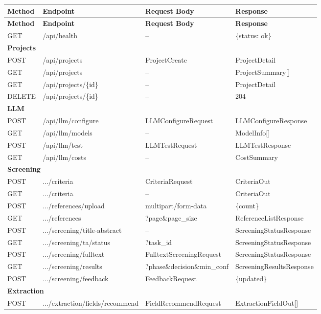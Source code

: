 \documentclass[11pt,a4paper]{article}
\begin{document}
\begin{longtable}{llp{4cm}p{3cm}}
\toprule
\textbf{Method} & \textbf{Endpoint} & \textbf{Request Body} & \textbf{Response} \\
\midrule
\endfirsthead
\toprule
\textbf{Method} & \textbf{Endpoint} & \textbf{Request Body} & \textbf{Response} \\
\midrule
\endhead
\bottomrule
\endfoot

GET & /api/health & -- & \{status: ok\} \\
\midrule
\multicolumn{4}{l}{\textbf{Projects}} \\
POST & /api/projects & ProjectCreate & ProjectDetail \\
GET & /api/projects & -- & ProjectSummary[] \\
GET & /api/projects/\{id\} & -- & ProjectDetail \\
DELETE & /api/projects/\{id\} & -- & 204 \\
\midrule
\multicolumn{4}{l}{\textbf{LLM}} \\
POST & /api/llm/configure & LLMConfigureRequest & LLMConfigureResponse \\
GET & /api/llm/models & -- & ModelInfo[] \\
POST & /api/llm/test & LLMTestRequest & LLMTestResponse \\
GET & /api/llm/costs & -- & CostSummary \\
\midrule
\multicolumn{4}{l}{\textbf{Screening}} \\
POST & .../criteria & CriteriaRequest & CriteriaOut \\
GET & .../criteria & -- & CriteriaOut \\
POST & .../references/upload & multipart/form-data & \{count\} \\
GET & .../references & ?page\&page\_size & ReferenceListResponse \\
POST & .../screening/title-abstract & -- & ScreeningStatusResponse \\
GET & .../screening/ta/status & ?task\_id & ScreeningStatusResponse \\
POST & .../screening/fulltext & FulltextScreeningRequest & ScreeningStatusResponse \\
GET & .../screening/results & ?phase\&decision\&min\_conf & ScreeningResultsResponse \\
POST & .../screening/feedback & FeedbackRequest & \{updated\} \\
\midrule
\multicolumn{4}{l}{\textbf{Extraction}} \\
POST & .../extraction/fields/recommend & FieldRecommendRequest & ExtractionFieldOut[] \\

\end{longtable}
\end{document}
